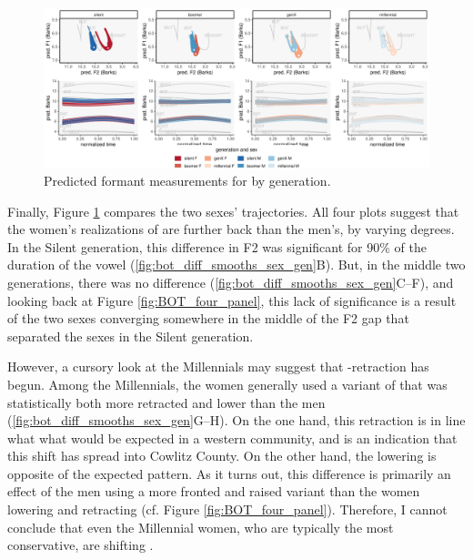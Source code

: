 \begin{figure}[p]
	\centering
	\includegraphics[angle = 90, origin = c, height = \textwidth]{Figures/BOT/BOT_sex_panel_plot_wide.pdf}
	\caption[Predicted formant measurements for \lot by generation.]{Predicted formant measurements for \lot by generation.}
	\label{fig:BOT_sex_panel_plot_wide}
\end{figure}

Finally, Figure \ref{fig:BOT_sex_panel_plot_wide} compares the two sexes' \lot trajectories. All four plots suggest that the women's realizations of \lot are further back than the men's, by varying degrees. In the Silent generation, this difference in F2 was significant for 90\% of the duration of the vowel (\ref{fig:bot_diff_smooths_sex_gen}B). But, in the middle two generations, there was no difference (\ref{fig:bot_diff_smooths_sex_gen}C--F), and looking back at Figure \ref{fig:BOT_four_panel}, this lack of significance is a result of the two sexes converging somewhere in the middle of the F2 gap that separated the sexes in the Silent generation.

However, a cursory look at the Millennials may suggest that \lot-retraction has begun. Among the Millennials, the women generally used a variant of \lot that was statistically both more retracted and lower than the men (\ref{fig:bot_diff_smooths_sex_gen}G--H). On the one hand, this retraction is in line what what would be expected in a western community, and is an indication that this shift has spread into Cowlitz County. On the other hand, the lowering is opposite of the expected pattern. As it turns out, this difference is primarily an effect of the men using a more fronted and raised variant than the women lowering and retracting (cf. Figure \ref{fig:BOT_four_panel}). Therefore, I cannot conclude that even the Millennial women, who are typically the most conservative, are shifting \lot.

